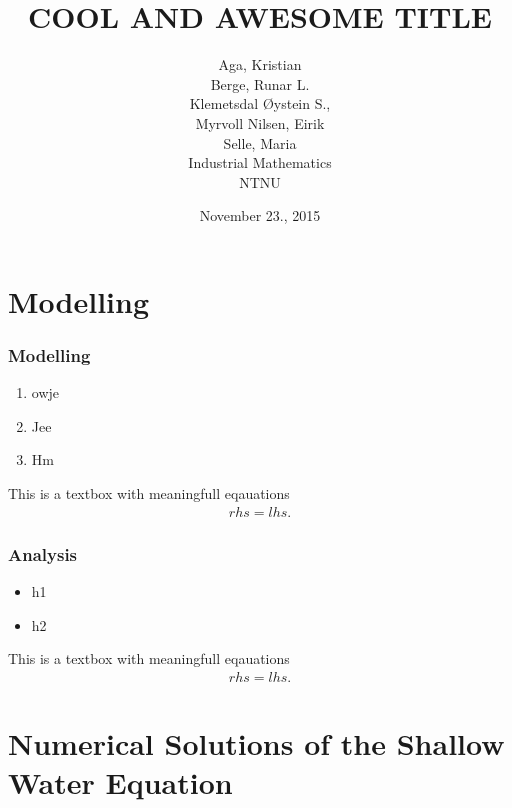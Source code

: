 \documentclass[screen]{beamer}
\title[Eksempelforedrag]%
{COOL AND AWESOME TITLE}
\author[aut]{Aga, Kristian \\ Berge, Runar L. \\ Klemetsdal Øystein S.,\\
	Myrvoll Nilsen, Eirik \\ Selle, Maria\\
	Industrial Mathematics\\
	NTNU
}
\institute[NTNU]{Institutt for matematiske fag}
\date{November 23., 2015}
\begin{document}
\ntnutitlepage

\section*{Modelling}
\begin{frame}
    \frametitle{Modelling}
    \begin{enumerate}[\label = $\circ$]
        \item    owje
        \item    Jee
        \item    Hm
    \end{enumerate}
    \begin{block}{This is a textbox with meaningfull eqauations}
        \begin{align*}
            rhs = lhs.
        \end{align*}
    \end{block}
\end{frame}

\begin{frame}
    \frametitle{Analysis}
    \begin{itemize}
        \pause
        \item    h1
        \pause
        \item    h2    
    \end{itemize}
    \pause
    \begin{block}{This is a textbox with meaningfull eqauations}
        \begin{align*}
            rhs = lhs.
        \end{align*}
    \end{block}
\end{frame}


\section*{Numerical Solutions of the Shallow Water Equation}
\end{document}
